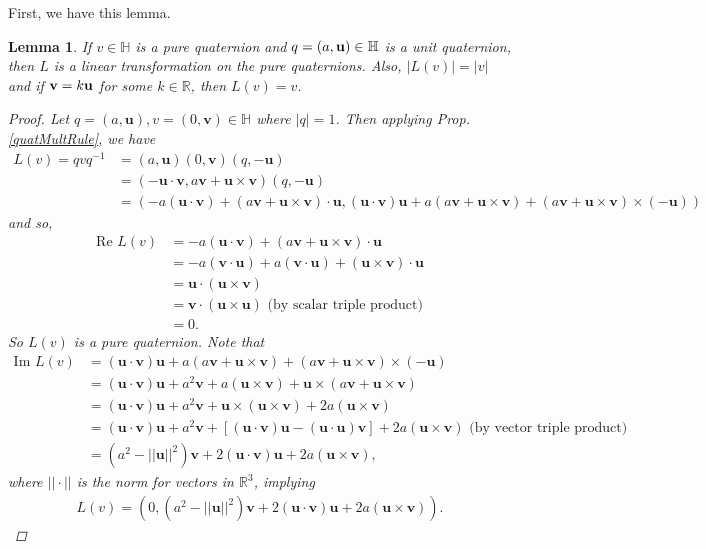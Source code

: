 \documentclass[12pt]{article}
\theoremstyle{plain}
\newtheorem{lem}[thm]{Lemma}
\theoremstyle{definition}
\begin{document}
First, we have this lemma. 
\begin{lem}
If $v\in\mathbb{H}$ is a pure quaternion and $q=(a,\textbf{\textup{u}})\in\mathbb{H}$ is a unit quaternion, then $L$ is a linear transformation on the pure quaternions. Also, $|L(v)|=|v|$ and if $\textbf{\textup{v}}=k\textbf{\textup{u}}$ for some $k\in\mathbb{R}$, then $L(v)=v$.
\begin{proof}
Let $q=(a,\textbf{u}),v=(0,\textbf{v})\in\mathbb{H}$ where $|q|=1$. Then applying Prop. \ref{quatMultRule}, we have
\begin{align*}
    L(v) = qvq^{-1} &= (a,\textbf{u})(0,\textbf{v})(q,-\textbf{u}) \\
        &= (-\textbf{u}\cdot\textbf{v}, a\textbf{v}+\textbf{u}\times\textbf{v})(q,-\textbf{u}) \\
        &= (-a(\textbf{u}\cdot\textbf{v})+(a\textbf{v}+\textbf{u}\times\textbf{v})\cdot\textbf{u}, (\textbf{u}\cdot\textbf{v})\textbf{u} + a(a\textbf{v}+\textbf{u}\times\textbf{v}) + (a\textbf{v}+\textbf{u}\times\textbf{v})\times(-\textbf{u}))
\end{align*}
and so,
\begin{align*}
    \text{Re } L(v) &= -a(\textbf{u}\cdot\textbf{v})+(a\textbf{v}+\textbf{u}\times\textbf{v})\cdot\textbf{u} \\
        &= -a(\textbf{v}\cdot\textbf{u})+a(\textbf{v}\cdot\textbf{u})+(\textbf{u}\times\textbf{v})\cdot\textbf{u} \\
        &= \textbf{u}\cdot(\textbf{u}\times\textbf{v}) \\
        &= \textbf{v}\cdot(\textbf{u}\times\textbf{u}) \text{ (by scalar triple product)}\\
        &= 0.
\end{align*}
So $L(v)$ is a pure quaternion. Note that
\begin{align*}
    \text{Im } L(v) &= (\textbf{u}\cdot\textbf{v})\textbf{u} + a(a\textbf{v}+\textbf{u}\times\textbf{v}) + (a\textbf{v}+\textbf{u}\times\textbf{v})\times(-\textbf{u}) \\
        &= (\textbf{u}\cdot\textbf{v})\textbf{u} + a^2\textbf{v} + a(\textbf{u}\times\textbf{v}) + \textbf{u}\times(a\textbf{v}+\textbf{u}\times\textbf{v}) \\
        &= (\textbf{u}\cdot\textbf{v})\textbf{u} + a^2\textbf{v} + \textbf{u}\times(\textbf{u}\times\textbf{v}) + 2a(\textbf{u}\times\textbf{v}) \\
        &= (\textbf{u}\cdot\textbf{v})\textbf{u} + a^2\textbf{v} + [(\textbf{u}\cdot\textbf{v})\textbf{u} - (\textbf{u}\cdot\textbf{u})\textbf{v}] + 2a(\textbf{u}\times\textbf{v}) \text{ (by vector triple product)}\\
        &= (a^2 - ||\textbf{u}||^2)\textbf{v} + 2(\textbf{u}\cdot\textbf{v})\textbf{u} + 2a(\textbf{u}\times\textbf{v}),
\end{align*}
where $||\cdot||$ is the norm for vectors in $\mathbb{R}^3$, implying 
\begin{align} \label{shortConj}
    L(v)=(0,(a^2 - ||\textbf{u}||^2)\textbf{v} + 2(\textbf{u}\cdot\textbf{v})\textbf{u} + 2a(\textbf{u}\times\textbf{v})).
\end{align}


\end{proof}
\end{lem}
\end{document}
